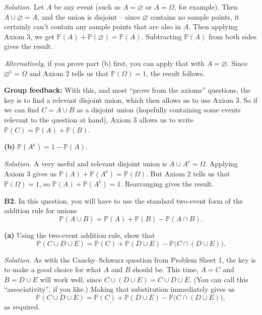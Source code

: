 \documentclass[
  a4paper,
]{book}
\theoremstyle{definition}
\theoremstyle{definition}
\theoremstyle{definition}
\theoremstyle{definition}
\theoremstyle{remark}
\begin{document}
\begin{myanswers}
\emph{Solution.} Let \(A\) be any event (such as \(A = \varnothing\) or \(A = \Omega\), for example). Then \(A \cup \varnothing = A\), and the union is disjoint -- since \(\varnothing\) contains no sample points, it certainly can't contain any sample points that are also in \(A\). Then applying Axiom 3, we get \(\mathbb P(A) + \mathbb P(\varnothing) = \mathbb P(A)\). Subtracting \(\mathbb P(A)\) from both sides gives the result.

\emph{Alternatively}, if you prove part (b) first, you can apply that with \(A = \varnothing\). Since \(\varnothing^\mathsf{c}= \Omega\) and Axiom 2 tells us that \(\mathbb P(\Omega) = 1\), the result follows.

\textbf{Group feedback:} With this, and most ``prove from the axioms'' questions, the key is to find a relevant disjoint union, which then allows us to use Axiom 3. So if we can find \(C = A \cup B\) as a disjoint union (hopefully containing some events relevant to the question at hand), Axiom 3 allows us to write \(\mathbb P(C) = \mathbb P(A) + \mathbb P(B)\).

\end{myanswers}

\textbf{(b)} \(\mathbb P(A^\mathsf{c}) = 1 - \mathbb P(A)\).

\begin{myanswers}
\emph{Solution.} A very useful and relevant disjoint union is \(A \cup A^\mathsf{c}= \Omega\). Applying Axiom 3 gives us \(\mathbb P(A) + \mathbb P(A^\mathsf{c}) = \mathbb P(\Omega)\). But Axiom 2 tells us that \(\mathbb P(\Omega) = 1\), so \(\mathbb P(A) + \mathbb P(A^\mathsf{c}) = 1\). Rearranging gives the result.

\end{myanswers}

\textbf{B2.} In this question, you will have to use the standard two-event form of the addition rule for unions
\[ \mathbb P(A \cup B) = \mathbb P(A) + \mathbb P(B) - \mathbb P(A \cap B) . \]

\textbf{(a)} Using the two-event addition rule, show that
\[ \mathbb P(C \cup D \cup E) = \mathbb P(C) + \mathbb P(D \cup E) - \mathbb P\big(C \cap (D \cup E)\big).  \]

\begin{myanswers}
\emph{Solution.} As with the Cauchy--Schwarz question from Problem Sheet 1, the key is to make a good choice for what \(A\) and \(B\) should be. This time, \(A = C\) and \(B = D \cup E\) will work well, since \(C \cup (D \cup E) = C \cup D \cup E\). (You can call this ``associativity'', if you like.) Making that substitution immediately gives us
\[ \mathbb P(C \cup D \cup E) = \mathbb P(C) + \mathbb P(D \cup E) - \mathbb P\big(C \cap (D \cup E)\big) ,  \]
as required.

\end{myanswers}
\end{document}
